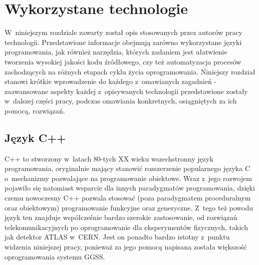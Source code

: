 \chapter{Wykorzystane technologie}
\label{ch:technologies}

\graphicspath{{2_technologies/static/}}

W~niniejszym rozdziale zawarty został opis stosowanych przez autorów pracy technologii. Przedstawione informacje obejmują zarówno wykorzystane języki programowania, jak również narzędzia, których zadaniem jest ułatwienie tworzenia wysokiej jakości kodu źródłowego, czy też automatyzacja procesów zachodzących na różnych etapach cyklu życia oprogramowania. Niniejszy rozdział stanowi krótkie wprowadzenie do każdego z~omawianych zagadnień - zaawansowane aspekty każdej z~opisywanych technologii przedstawione zostały w~dalszej części pracy, podczas omawiania konkretnych, osiągniętych za ich pomocą, rozwiązań. 


\section{Język C++}
C++ \cite{Bjarne} \cite{cpp_reference} to stworzony w~latach 80-tych XX wieku wszechstronny język programowania, oryginalnie mający stanowić rozszerzenie popularnego języka C~\cite{c_book} o~mechanizmy pozwalające na programowanie obiektowe. Wraz z~jego rozwojem pojawiło się natomiast wsparcie dla innych paradygmatów programowania, dzięki czemu nowoczesny C++ pozwala stosować (poza paradygmatem proceduralnym oraz obiektowym) programowanie funkcyjne oraz generyczne. Z~tego też powodu język ten znajduje współcześnie bardzo szerokie zastosowanie, od rozwiązań telekomunikacyjnych po oprogramowanie dla eksperymentów fizycznych, takich jak detektor ATLAS w~CERN. Jest on ponadto bardzo istotny z~punktu widzenia niniejszej pracy, ponieważ za jego pomocą napisana została większość oprogramowania systemu GGSS.

